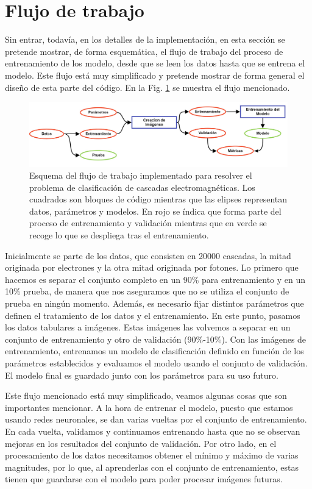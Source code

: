 \documentclass[a4paper,12pt,oneside,titlepage]{book}
\begin{document}
\section{Flujo de trabajo}

Sin entrar, todavía, en los detalles de la implementación, en esta sección se pretende mostrar, de forma esquemática, el flujo de trabajo del proceso de entrenamiento de los modelo, desde que se leen los datos hasta que se entrena el modelo. Este flujo está muy simplificado y pretende mostrar de forma general el diseño de esta parte del código. En la Fig. \ref{fig:flujo} se muestra el flujo mencionado.

\begin{figure}[h!]
  \centering
  \includegraphics[scale=0.40, center]{flujo1.pdf}
  \caption{Esquema del flujo de trabajo implementado para resolver el problema de clasificación de cascadas electromagnéticas. Los cuadrados son bloques de código mientras que las elipses representan datos, parámetros y modelos. En rojo se índica que forma parte del proceso de entrenamiento y validación mientras que en verde se recoge lo que se despliega tras el entrenamiento.}
  \label{fig:flujo}
\end{figure}

Inicialmente se parte de los datos, que consisten en 20000 cascadas, la mitad originada por electrones y la otra mitad originada por fotones. Lo primero que hacemos es separar el conjunto completo en un 90\% para entrenamiento y en un 10\% prueba, de manera que nos aseguramos que no se utiliza el conjunto de prueba en ningún momento. Además, es necesario fijar distintos parámetros que definen el tratamiento de los datos y el entrenamiento. En este punto, pasamos los datos tabulares a imágenes. Estas imágenes las volvemos a separar en un conjunto de entrenamiento y otro de validación (90\%-10\%). Con las imágenes de entrenamiento, entrenamos un modelo de clasificación definido en función de los parámetros establecidos y evaluamos el modelo usando el conjunto de validación. El modelo final es guardado junto con los parámetros para su uso futuro.

Este flujo mencionado está muy simplificado, veamos algunas cosas que son importantes mencionar. A la hora de entrenar el modelo, puesto que estamos usando redes neuronales, se dan varias vueltas por el conjunto de entrenamiento. En cada vuelta, validamos y continuamos entrenando hasta que no se observan mejoras en los resultados del conjunto de validación. Por otro lado, en el procesamiento de los datos necesitamos obtener el mínimo y máximo de varias magnitudes, por lo que, al aprenderlas con el conjunto de entrenamiento, estas tienen que guardarse con el modelo para poder procesar imágenes futuras.
\end{document}
